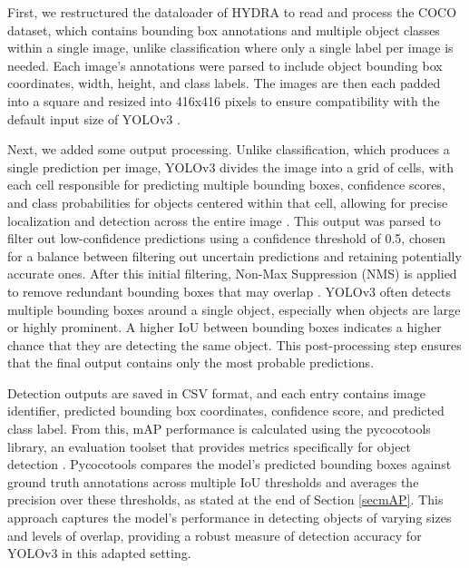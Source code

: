 \documentclass[journal,onecolumn,12pt]{IEEEtran}
\begin{document}
First, we restructured the dataloader of HYDRA to read and process the COCO dataset, which contains bounding box annotations and multiple object classes within a single image, unlike classification where only a single label per image is needed. Each image’s annotations were parsed to include object bounding box coordinates, width, height, and class labels. The images are then each padded into a square and resized into 416x416 pixels to ensure compatibility with the default input size of YOLOv3 \cite{architecture}.

Next, we added some output processing. Unlike classification, which produces a single prediction per image, YOLOv3 divides the image into a grid of cells, with each cell responsible for predicting multiple bounding boxes, confidence scores, and class probabilities for objects centered within that cell, allowing for precise localization and detection across the entire image \cite{redmon2018yolov3incrementalimprovement}. This output was parsed to filter out low-confidence predictions using a confidence threshold of 0.5, chosen for a balance between filtering out uncertain predictions and retaining potentially accurate ones. After this initial filtering, Non-Max Suppression (NMS) is applied to remove redundant bounding boxes that may overlap \cite{nms}. YOLOv3 often detects multiple bounding boxes around a single object, especially when objects are large or highly prominent. A higher IoU between bounding boxes indicates a higher chance that they are detecting the same object. This post-processing step ensures that the final output contains only the most probable predictions.

Detection outputs are saved in CSV format, and each entry contains image identifier, predicted bounding box coordinates, confidence score, and predicted class label. From this, mAP performance is calculated using the pycocotools library, an evaluation toolset that provides metrics specifically for object detection \cite{lin2015microsoft}. Pycocotools compares the model’s predicted bounding boxes against ground truth annotations across multiple IoU thresholds and averages the precision over these thresholds, as stated at the end of Section \ref{secmAP}. This approach captures the model’s performance in detecting objects of varying sizes and levels of overlap, providing a robust measure of detection accuracy for YOLOv3 in this adapted setting.
\end{document}
